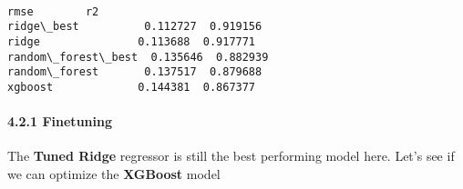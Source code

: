 \documentclass[11pt]{article}
\makeatletter
\newcommand{\boxspacing}{\kern\kvtcb@left@rule\kern\kvtcb@boxsep}
\newcommand{\prompt}[4]{
        {\ttfamily\llap{{\color{#2}[#3]:\hspace{3pt}#4}}\vspace{-\baselineskip}}
    }
\makeatother
\begin{document}
    \begin{center}
    \end{center}
    { \hspace*{\fill} \\}
    
            \begin{tcolorbox}[breakable, size=fbox, boxrule=.5pt, pad at break*=1mm, opacityfill=0]
\prompt{Out}{outcolor}{32}{\boxspacing}
\begin{Verbatim}[commandchars=\\\{\}]
                        rmse        r2
ridge\_best          0.112727  0.919156
ridge               0.113688  0.917771
random\_forest\_best  0.135646  0.882939
random\_forest       0.137517  0.879688
xgboost             0.144381  0.867377
\end{Verbatim}
\end{tcolorbox}
        
    \paragraph{4.2.1 Finetuning}\label{finetuning}

    The \textbf{Tuned Ridge} regressor is still the best performing model
here. Let's see if we can optimize the \textbf{XGBoost} model
\end{document}
